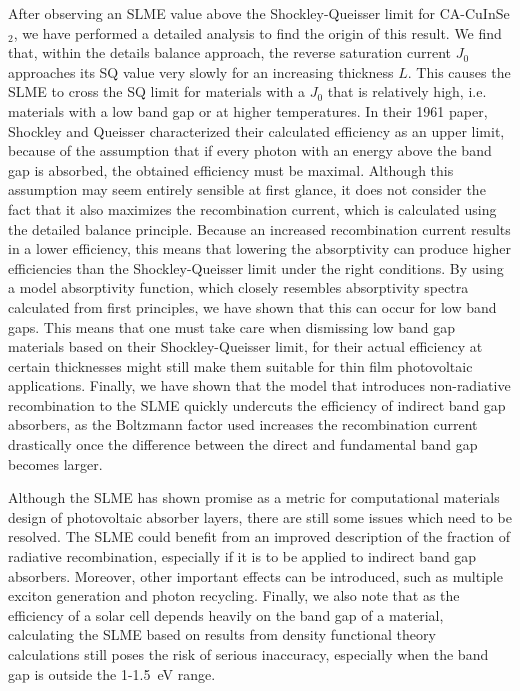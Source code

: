 \begin{refsection}
After observing an SLME value above the Shockley-Queisser limit for 
\mbox{CA-CuInSe$_2$}, we have performed a detailed analysis to find the origin 
of this result. We find that, within the details balance approach, the reverse 
saturation current $J_0$ approaches its SQ value very slowly for an increasing 
thickness $L$. This causes the SLME to cross the SQ limit for materials with a 
$J_0$ that is relatively high, i.e. materials with a low band gap or at higher 
temperatures. In their 1961 paper, Shockley and Queisser characterized their 
calculated efficiency as an upper limit, because of the assumption that if 
every photon with an energy above the band gap is absorbed, the obtained 
efficiency must be maximal. Although this assumption may seem entirely 
sensible at first glance, it does not consider the fact that it also maximizes 
the recombination current, which is calculated using the detailed balance 
principle. Because an increased recombination current results in a lower efficiency, 
this means that lowering the absorptivity can produce higher efficiencies than 
the Shockley-Queisser limit under the right conditions. By using a model 
absorptivity function, which closely resembles absorptivity spectra calculated 
from first principles, we have shown that this can occur for low band gaps. 
This means that one must take care when dismissing low band gap materials 
based on their Shockley-Queisser limit, for their actual efficiency at certain 
thicknesses might still make them suitable for thin film photovoltaic 
applications. Finally, we have shown that the model that introduces non-radiative 
recombination to the SLME quickly undercuts the efficiency of indirect band 
gap absorbers, as the Boltzmann factor used increases the recombination 
current drastically once the difference between the direct and fundamental 
band gap becomes larger. 

Although the SLME has shown promise as a metric for computational materials design 
of photovoltaic absorber layers, there are still some issues which need to be 
resolved. The SLME could benefit from an improved description of the fraction of 
radiative recombination, especially if it is to be applied to indirect band gap absorbers. 
Moreover, other important effects can be introduced, such as multiple exciton 
generation and photon recycling. Finally, we also note that as the efficiency of 
a solar cell depends heavily on the band gap of a material, calculating the SLME 
based on results from density functional theory calculations still poses the risk 
of serious inaccuracy, especially when the band gap is outside the 1-1.5~\si{\electronvolt} range.

\printbibliography 
\end{refsection} 
